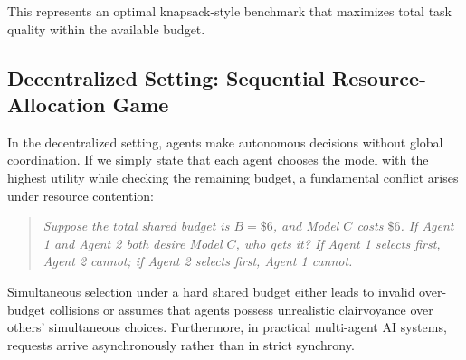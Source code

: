 \documentclass{article}
\begin{document}
This represents an optimal knapsack-style benchmark that maximizes total task quality within the available budget.

\subsection{Decentralized Setting: Sequential Resource-Allocation Game}

In the decentralized setting, agents make autonomous decisions without global coordination. If we simply state that each agent chooses the model with the highest utility while checking the remaining budget, a fundamental conflict arises under resource contention:
\begin{quote}
\textit{Suppose the total shared budget is $B = \$6$, and Model $C$ costs $\$6$. If Agent 1 and Agent 2 both desire Model $C$, who gets it? If Agent 1 selects first, Agent 2 cannot; if Agent 2 selects first, Agent 1 cannot.}
\end{quote}
Simultaneous selection under a hard shared budget either leads to invalid over-budget collisions or assumes that agents possess unrealistic clairvoyance over others' simultaneous choices. Furthermore, in practical multi-agent AI systems, requests arrive asynchronously rather than in strict synchrony.
\end{document}
